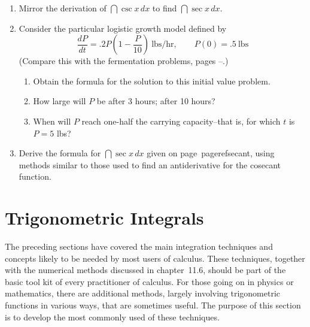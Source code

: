 \begin{enumerate}
  \begin{enumerate}
  \item $\dint_2^3 \dfrac{3 \, dx}{(x - 1)(x + 2)}$


  \item $\dint_2^4 \dfrac{dt}{t(t^2-1)}$

  \item $\dint_0^{\pi/4} \dfrac{x \, dx}{1 - x^2}$


  \item $\dint_1^{\sqrt{3}} \dfrac{x^2 + 2x + 1}{x(x^2 + 1)} \, dx$
\mbox{}


\end{enumerate}
\item Mirror the derivation of $\dint \csc{x}\,dx$ to find $\dint
\sec{x}\,dx.$


\item Consider the particular logistic growth model defined by
	\[
\dfrac{dP}{dt} = .2 P\left( 1 - \dfrac{P}{10} \right) \ \mbox{lbs/hr},
	 \qquad P(0) = .5 \ \mbox{lbs}
\] (Compare this with the fermentation problems, pages
         \pageref{ferment-begin}--\pageref{ferment-end}.)


  \begin{enumerate}
  \item Obtain the formula for the solution to this initial value problem.

  \item How large will $P$ be after 3 hours; after 10 hours?

  \item When will $P$ reach one-half the carrying capacity--that is, for
which $t$ is $P = 5$ lbs?


\end{enumerate}
\item Derive the formula for $\dint \sec{x}\,dx$ given on
page~pageref{secant}, using methods similar to those used to find an
antiderivative for the cosecant function.




\end{enumerate}
\section{Trigonometric Integrals}
\label{sec:trigonometric-integrals}

The preceding sections have covered the main integration techniques
and concepts likely to be needed by most users of calculus.  These
techniques, together with the numerical methods discussed in
chapter~11.6, should be part of the basic tool kit of every
practitioner of calculus.  For those going on in physics or
mathematics, there are additional methods, largely involving
trigonometric functions in various ways, that are sometimes useful.
The purpose of this section is to develop the most commonly used of
these techniques.

